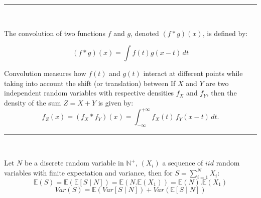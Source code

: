 \hrule
\begin{f}{\ }
	
	The convolution of two functions \( f \) and \( g \), denoted \( (f * g)(x) \), is defined by:
	
	\[
	(f * g)(x) = \int f(t) g(x - t) \, dt
	\]
	
	Convolution measures how \( f(t) \) and \( g(t) \) interact at different points while taking into account the shift (or translation) between
	If \(X\) and \(Y\) are two independent random variables with respective densities \(f_X\) and \(f_Y\), then the density of the sum \(Z = X + Y\) is given by:
	\[
	f_Z(x) = (f_X * f_Y)(x) = \int_{-\infty}^{+\infty} f_X(t)\, f_Y(x - t)\, dt.
	\]
	
\end{f}
\hrule
\begin{f}
	{\ }
	
	Let \(N\) be a discrete random variable in \(\mathbb{N}^+\), \(\left(X_i\right)\) a sequence of \(iid\) random variables with finite expectation and variance, then for \(\displaystyle S=\sum_{i=1}^{N}X_i\):
	\[
	\mathbb{E}(S) = \mathbb{E} (\mathbb{E} [S \mid N]) = \mathbb{E} (N.\mathbb{E}(X_1)) = \mathbb{E}(N).\mathbb{E}(X_1)
	\]
	\[
	Var (S) = \mathbb{E} (Var [S \mid N]) + Var (\mathbb{E} [S \mid N])
	\]
\end{f}

